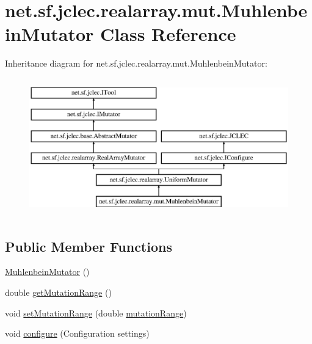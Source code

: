 \hypertarget{classnet_1_1sf_1_1jclec_1_1realarray_1_1mut_1_1_muhlenbein_mutator}{\section{net.\-sf.\-jclec.\-realarray.\-mut.\-Muhlenbein\-Mutator Class Reference}
\label{classnet_1_1sf_1_1jclec_1_1realarray_1_1mut_1_1_muhlenbein_mutator}
}
Inheritance diagram for net.\-sf.\-jclec.\-realarray.\-mut.\-Muhlenbein\-Mutator\-:\begin{figure}[H]
\begin{center}
\leavevmode
\includegraphics[height=6.000000cm]{classnet_1_1sf_1_1jclec_1_1realarray_1_1mut_1_1_muhlenbein_mutator}
\end{center}
\end{figure}
\subsection*{Public Member Functions}
\begin{DoxyCompactItemize}
\item 
\hyperlink{classnet_1_1sf_1_1jclec_1_1realarray_1_1mut_1_1_muhlenbein_mutator_a881be27935f2c05f95874dd5d59d5432}{Muhlenbein\-Mutator} ()
\item 
double \hyperlink{classnet_1_1sf_1_1jclec_1_1realarray_1_1mut_1_1_muhlenbein_mutator_a258a6a309ce636737d5f4728cccb76d0}{get\-Mutation\-Range} ()
\item 
void \hyperlink{classnet_1_1sf_1_1jclec_1_1realarray_1_1mut_1_1_muhlenbein_mutator_a7883c65370a8752f32341681781485d2}{set\-Mutation\-Range} (double \hyperlink{classnet_1_1sf_1_1jclec_1_1realarray_1_1mut_1_1_muhlenbein_mutator_a6bb0c418a6e02778dd1e4192f31afe4a}{mutation\-Range})
\item 
void \hyperlink{classnet_1_1sf_1_1jclec_1_1realarray_1_1mut_1_1_muhlenbein_mutator_a5409607c7d8f58933b90a0d946d92629}{configure} (Configuration settings)
\end{DoxyCompactItemize}

